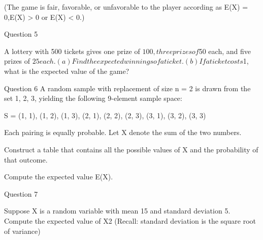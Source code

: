 (The game is fair, favorable, or unfavorable to the player according as E(X) = 0,E(X) > 0 or E(X) < 0.)

Question 5

A lottery with 500 tickets gives one prize of $100, three prizes of $50 each, and five prizes of $25 each.
(a) Find the expected winnings of a ticket. 
(b) If a ticket costs $1, what is the expected value of the game?

Question 6
A random sample with replacement of size n = 2 is drawn from the set {1, 2, 3}, yielding the following
9-element sample space:

S = {(1, 1), (1, 2), (1, 3), (2, 1), (2, 2), (2, 3), (3, 1), (3, 2), (3, 3)}

Each pairing is equally probable. Let X denote the sum of the two numbers. 

Construct a table that contains all the possible values of X and the probability of that outcome.

Compute the expected value E(X).

Question 7

Suppose X is a random variable with mean 15 and standard deviation 5.
Compute the expected value of X2  (Recall: standard deviation is the square root of variance)






